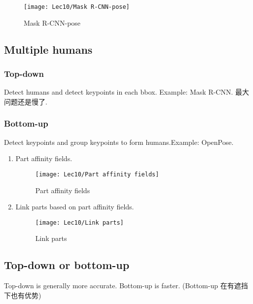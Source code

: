 \begin{wrapfigure}[7]{r}{0.38\textwidth}
    \centering
    \texttt{[image: Lec10/Mask R-CNN-pose]}
    \caption{Mask R-CNN-pose}
\end{wrapfigure}

\quad

\subsection{Multiple humans}

\subsubsection{Top-down}

Detect humans and detect keypoints in each bbox. Example: Mask R-CNN. 最大问题还是慢了. 



\subsubsection{Bottom-up}
Detect keypoints and group keypoints to form humans.Example: OpenPose. 

\begin{enumerate}
    \item Part affinity fields. 
    \begin{figure}[H]
        \centering
        \texttt{[image: Lec10/Part affinity fields]}
        \caption{Part affinity fields}
    \end{figure}
    
    \item Link parts based on part affinity fields. 
    
    \begin{figure}[H]
        \centering
        \texttt{[image: Lec10/Link parts]}
        \caption{Link parts}
    \end{figure}
\end{enumerate}

\subsection{Top-down or bottom-up}
Top-down is generally more accurate. Bottom-up is faster. (Bottom-up 在有遮挡下也有优势)

